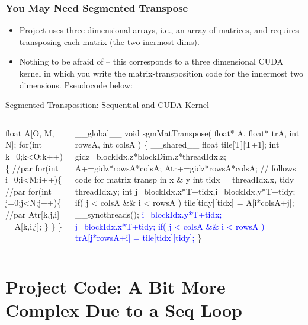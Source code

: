 \documentclass{beamer}
\newcommand{\blue}[1]{\textcolor{Blue}{{#1}}}
\newcommand{\emp}[1]{\textcolor{DikuRed}{ #1}}
\newcommand{\emphh}[1]{\textcolor{CosGreen}{ #1}}
\begin{document}
\begin{frame}[fragile,t]
  \frametitle{You May Need Segmented Transpose} %


\begin{itemize}
\item Project uses three dimensional arrays,
        i.e., an array of matrices, and requires transposing
        each matrix (the two inermost dims).\smallskip

\item Nothing to be afraid of -- this corresponds to 
        a three dimensional CUDA kernel in which you 
        write the matrix-transposition code for the innermost
        two dimensions. Pseudocode below:  
\end{itemize}

\begin{block}{Segmented Transposition: Sequential and CUDA Kernel}
\begin{columns}
\vspace{-2ex}
\begin{colorcode}
\emp{float A[O, M, N];}
\emphh{for(int k=0;k<O;k++)\{ //par}
  \emphh{for(int i=0;i<M;i++)\{ //par}
    \emphh{for(int j=0;j<N;j++)\{ //par}
      \emp{Atr[k,j,i] = A[k,i,j];}
\} \} \}
\end{colorcode}
\vspace{-2ex}
\begin{colorcode}
__global__ void sgmMatTranspose( float* A,  
      float* trA, int rowsA, int colsA ) \{
  __shared__ float tile[T][T+1];
  \emp{int gidz=blockIdx.z*blockDim.z*threadIdx.z;}
  \emp{A+=gidz*rowsA*colsA; Atr+=gidz*rowsA*colsA;}
  \emp{// follows code for matrix transp in x \& y}
  int tidx = threadIdx.x, tidy = threadIdx.y;
  int j=blockIdx.x*T+tidx,i=blockIdx.y*T+tidy;
  if( j < colsA && i < rowsA )
    tile[tidy][tidx] = A[i*colsA+j];
  __syncthreads();
  \blue{i=blockIdx.y*T+tidx; j=blockIdx.x*T+tidy;}
  \blue{if( j < colsA && i < rowsA )}
    \blue{trA[j*rowsA+i] = tile[tidx][tidy];}
\}
\end{colorcode}
\end{columns}
\end{block} 

\end{frame}



\section{Project Code: A Bit More Complex Due to a Seq Loop}
\end{document}
